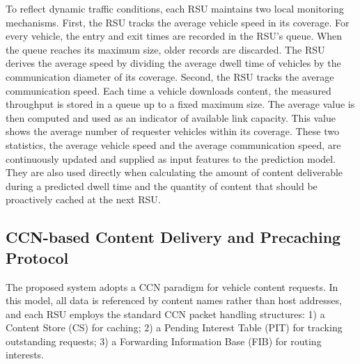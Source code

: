 \documentclass[journal]{IEEEtran}
\begin{document}
To reflect dynamic traffic conditions, each RSU maintains two local monitoring mechanisms.
First, the RSU tracks the average vehicle speed in its coverage.
For every vehicle, the entry and exit times are recorded in the RSU's queue.
When the queue reaches its maximum size, older records are discarded.
The RSU derives the average speed by dividing the average dwell time of vehicles by the communication diameter of its coverage.
Second, the RSU tracks the average communication speed.
Each time a vehicle downloads content, the measured throughput is stored in a queue up to a fixed maximum size.
The average value is then computed and used as an indicator of available link capacity.
This value shows the average number of requester vehicles within its coverage.
These two statistics, the average vehicle speed and the average communication speed, are continuously updated and supplied as input features to the prediction model.
They are also used directly when calculating the amount of content deliverable during a predicted dwell time and the quantity of content that should be proactively cached at the next RSU.

\subsection{CCN-based Content Delivery and Precaching Protocol}
The proposed system adopts a CCN paradigm for vehicle content requests.
In this model, all data is referenced by content names rather than host addresses, and each RSU employs the standard CCN packet handling structures: 
1) a Content Store (CS) for caching; 
2) a Pending Interest Table (PIT) for tracking outstanding requests; 
3) a Forwarding Information Base (FIB) for routing interests.
\end{document}
